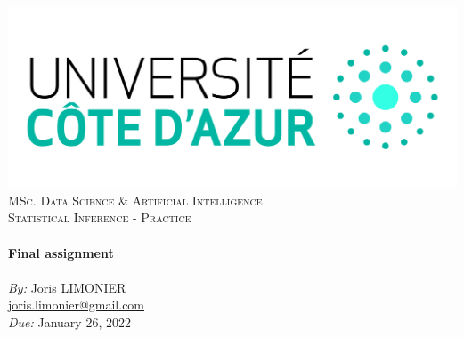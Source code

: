 \begin{titlepage}
	\begin{center}
		\includegraphics[width=\textwidth]{images/logo_uca.jpeg}\\[1.7cm]
		\textsc{\Large MSc. Data Science \& Artificial Intelligence}\\[1.5cm]
		\textsc{\Large Statistical Inference - Practice}\\[1.5cm]
		\vfill
		\HRule \\[0.7cm]
		{\huge \bfseries Final assignment}\\[0.4cm]
		\HRule \\
		\vfill
		\large
		\textit{By:} \Large{Joris LIMONIER}\\[.5cm]
		\href{mailto:joris.limonier@gmail.com}{\color{black}joris.limonier@gmail.com} \\[.2cm]
		\vfill
		\Large{\textit{Due:} January 26, 2022}
	\end{center}
\end{titlepage}


